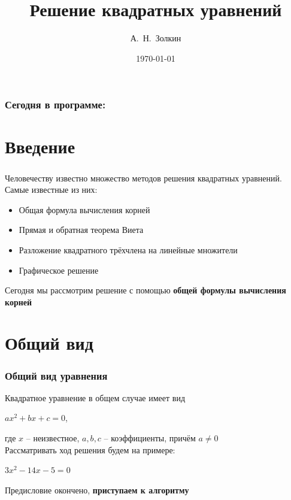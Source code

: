 \documentclass[t]{beamer}
\title{Решение квадратных уравнений}
\author{А.~Н.~Золкин}
\date{\today}
\begin{document}
\frame[plain]{\titlepage}

\begin{frame}
    \frametitle{Сегодня в программе:}
    \tableofcontents
\end{frame}

\section{Введение}
\begin{frame}
    \frametitle{\insertsection}
    Человечеству известно множество методов решения квадратных уравнений.
    Самые известные из них:
    \begin{itemize}
        \item Общая формула вычисления корней
        \item Прямая и обратная теорема Виета
        \item Разложение квадратного трёхчлена на линейные множители
        \item Графическое решение
    \end{itemize} \pause
    Сегодня мы рассмотрим решение с помощью \textbf{общей формулы вычисления корней}
\end{frame}

\section{Общий вид}
\begin{frame}
    \frametitle{Общий вид уравнения}
    Квадратное уравнение в общем случае имеет вид
    \begin{center}
        $ax^2 + bx + c = 0$,
    \end{center}
    где $x$ -- неизвестное, $a, b, c$ -- коэффициенты, причём $a \neq 0$ \\
    \pause
    Рассматривать ход решения будем на примере:
    \begin{center}
        $3x^2 - 14x - 5 = 0$
    \end{center}
    \pause Предисловие окончено, \alert{\textbf{приступаем к алгоритму}}
\end{frame}
\end{document}
